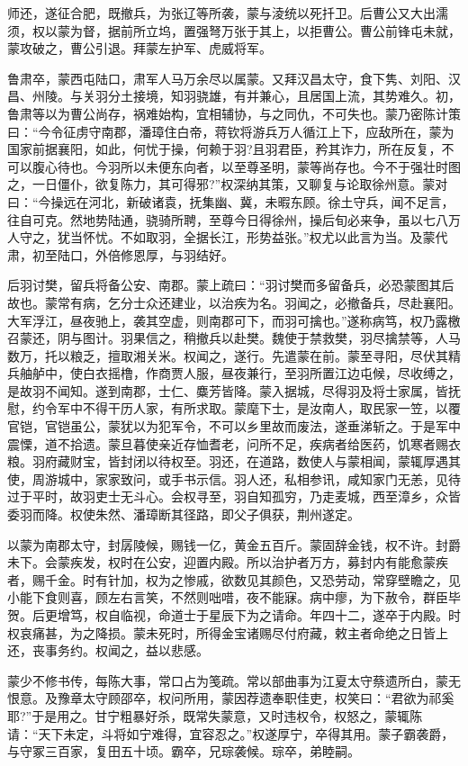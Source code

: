 \documentclass[12pt,UTF8]{ctexbook}
\begin{document}
师还，遂征合肥，既撤兵，为张辽等所袭，蒙与淩统以死扦卫。后曹公又大出濡须，权以蒙为督，据前所立坞，置强弩万张于其上，以拒曹公。曹公前锋屯未就，蒙攻破之，曹公引退。拜蒙左护军、虎威将军。

鲁肃卒，蒙西屯陆口，肃军人马万余尽以属蒙。又拜汉昌太守，食下隽、刘阳、汉昌、州陵。与关羽分土接境，知羽骁雄，有并兼心，且居国上流，其势难久。初，鲁肃等以为曹公尚存，祸难始构，宜相辅协，与之同仇，不可失也。蒙乃密陈计策曰：“今令征虏守南郡，潘璋住白帝，蒋钦将游兵万人循江上下，应敌所在，蒙为国家前据襄阳，如此，何忧于操，何赖于羽?且羽君臣，矜其诈力，所在反复，不可以腹心待也。今羽所以未便东向者，以至尊圣明，蒙等尚存也。今不于强壮时图之，一日僵仆，欲复陈力，其可得邪?”权深纳其策，又聊复与论取徐州意。蒙对曰：“今操远在河北，新破诸袁，抚集幽、冀，未暇东顾。徐土守兵，闻不足言，往自可克。然地势陆通，骁骑所聘，至尊今日得徐州，操后旬必来争，虽以七八万人守之，犹当怀忧。不如取羽，全据长江，形势益张。”权尤以此言为当。及蒙代肃，初至陆口，外倍修恩厚，与羽结好。

后羽讨樊，留兵将备公安、南郡。蒙上疏曰：“羽讨樊而多留备兵，必恐蒙图其后故也。蒙常有病，乞分士众还建业，以治疾为名。羽闻之，必撤备兵，尽赴襄阳。大军浮江，昼夜驰上，袭其空虚，则南郡可下，而羽可擒也。”遂称病笃，权乃露檄召蒙还，阴与图计。羽果信之，稍撤兵以赴樊。魏使于禁救樊，羽尽擒禁等，人马数万，托以粮乏，擅取湘关米。权闻之，遂行。先遣蒙在前。蒙至寻阳，尽伏其精兵舳舻中，使白衣摇橹，作商贾人服，昼夜兼行，至羽所置江边屯候，尽收缚之，是故羽不闻知。遂到南郡，士仁、麋芳皆降。蒙入据城，尽得羽及将士家属，皆抚慰，约令军中不得干历人家，有所求取。蒙麾下士，是汝南人，取民家一笠，以覆官铠，官铠虽公，蒙犹以为犯军令，不可以乡里故而废法，遂垂涕斩之。于是军中震慄，道不拾遗。蒙旦暮使亲近存恤耆老，问所不足，疾病者给医药，饥寒者赐衣粮。羽府藏财宝，皆封闭以待权至。羽还，在道路，数使人与蒙相闻，蒙辄厚遇其使，周游城中，家家致问，或手书示信。羽人还，私相参讯，咸知家门无恙，见待过于平时，故羽吏士无斗心。会权寻至，羽自知孤穷，乃走麦城，西至漳乡，众皆委羽而降。权使朱然、潘璋断其径路，即父子俱获，荆州遂定。

以蒙为南郡太守，封孱陵候，赐钱一亿，黄金五百斤。蒙固辞金钱，权不许。封爵未下。会蒙疾发，权时在公安，迎置内殿。所以治护者万方，募封内有能愈蒙疾者，赐千金。时有针加，权为之惨戚，欲数见其颜色，又恐劳动，常穿壁瞻之，见小能下食则喜，顾左右言笑，不然则咄唶，夜不能寐。病中瘳，为下赦令，群臣毕贺。后更增笃，权自临视，命道士于星辰下为之请命。年四十二，遂卒于内殿。时权哀痛甚，为之降损。蒙未死时，所得金宝诸赐尽付府藏，敕主者命绝之日皆上还，丧事务约。权闻之，益以悲感。

蒙少不修书传，每陈大事，常口占为笺疏。常以部曲事为江夏太守蔡遗所白，蒙无恨意。及豫章太守顾邵卒，权问所用，蒙因荐遗奉职佳吏，权笑曰：“君欲为祁奚耶?”于是用之。甘宁粗暴好杀，既常失蒙意，又时违权令，权怒之，蒙辄陈请：“天下未定，斗将如宁难得，宜容忍之。”权遂厚宁，卒得其用。蒙子霸袭爵，与守冢三百家，复田五十顷。霸卒，兄琮袭候。琮卒，弟睦嗣。
\end{document}
